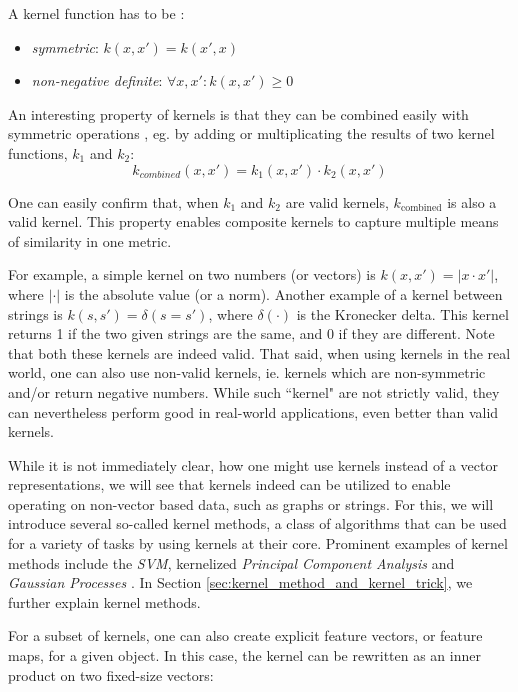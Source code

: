 A kernel function has to be \cite{Kriege2012}:
\begin{itemize}
    \item{\textit{symmetric}: $k(x, x') = k(x', x)$}
    \item{\textit{non-negative definite}: $\forall x, x': k(x, x') \geq 0$}
\end{itemize}

An interesting property of kernels is that they can be combined easily with symmetric operations \cite[p.~296]{Bishop2006}, eg. by adding or multiplicating the results of two kernel functions, $k_1$ and $k_2$:
\begin{equation*}
k_{combined}(x, x') = k_1(x, x') \cdot k_2(x, x')
\end{equation*}

One can easily confirm that, when $k_1$ and $k_2$ are valid kernels, $k_{\mathrm{combined}}$ is also a valid kernel.
This property enables composite kernels to capture multiple means of similarity in one metric.

For example, a simple kernel on two numbers (or vectors) is $k(x, x') = | x \cdot x' |$, where $| \cdot |$ is the absolute value (or a norm).
Another example of a kernel between strings is $k(s, s') = \delta(s = s')$, where $\delta(\cdot)$ is the Kronecker delta. This kernel returns 1 if the two given strings are the same, and 0 if they are different.
Note that both these kernels are indeed valid.
That said, when using kernels in the real world, one can also use non-valid kernels, ie. kernels which are non-symmetric and/or return negative numbers. While such ``kernel" are not strictly valid, they can nevertheless perform good in real-world applications, even better than valid kernels.

While it is not immediately clear, how one might use kernels instead of a vector representations, we will see that kernels indeed can be utilized to enable operating on non-vector based data, such as graphs or strings.
For this, we will introduce several so-called kernel methods, a class of algorithms that can be used for a variety of tasks by using kernels at their core.
Prominent examples of kernel methods include the \textit{SVM}, kernelized \textit{Principal Component Analysis} \cite{Scholkopf1998} and \textit{Gaussian Processes} \cite[p.~303]{Bishop2006}.
In Section \ref{sec:kernel_method_and_kernel_trick}, we further explain kernel methods.

For a subset of kernels, one can also create explicit feature vectors, or feature maps, for a given object. In this case, the kernel can be rewritten as an inner product on two fixed-size vectors:

